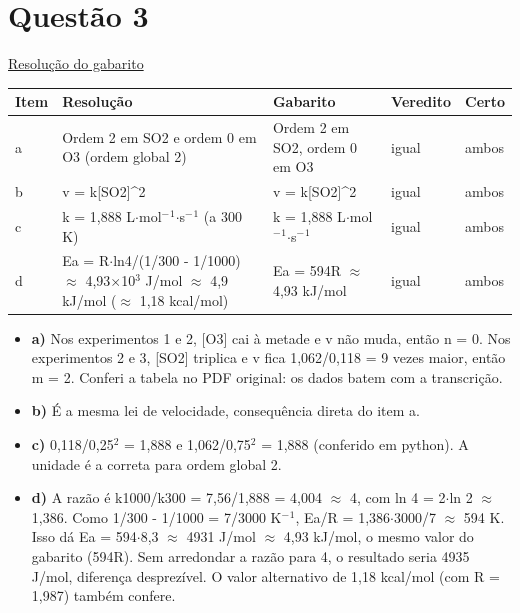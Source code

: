 \documentclass{article}%
\begin{document}
\section*{Questão 3}%
\href{https://poliedroresolve.sistemapoliedro.com.br/vestibulares/ime/2027/ime-2-fase-dia-3-28-10-2026-2-fase-dia-3/dissertativa-3-quimica-2-fase-dia-3-ime-2027}{Resolução do gabarito}\par\smallskip%
\begin{longtable}{@{}p{} p{} p{} p{} p{}@{}}\toprule Item & Resolução & Gabarito & Veredito & Certo \\ \midrule
a & Ordem 2 em SO2 e ordem 0 em O3 (ordem global 2) & Ordem 2 em SO2, ordem 0 em O3 & igual & ambos \\
b & v = k{[}SO2{]}\^{}2 & v = k{[}SO2{]}\^{}2 & igual & ambos \\
c & k = 1,888 L$\cdot$mol$^{-}$$^{1}$$\cdot$s$^{-}$$^{1}$ (a 300 K) & k = 1,888 L$\cdot$mol$^{-}$$^{1}$$\cdot$s$^{-}$$^{1}$ & igual & ambos \\
d & Ea = R$\cdot$ln4/(1/300 - 1/1000) $\approx$ 4,93$\times$10$^3$ J/mol $\approx$ 4,9 kJ/mol ($\approx$ 1,18 kcal/mol) & Ea = 594R $\approx$ 4,93 kJ/mol & igual & ambos \\
\bottomrule\end{longtable}%
\begin{itemize}%
\item%
\textbf{a)} Nos experimentos 1 e 2, {[}O3{]} cai à metade e v não muda, então n = 0. Nos experimentos 2 e 3, {[}SO2{]} triplica e v fica 1,062/0,118 = 9 vezes maior, então m = 2. Conferi a tabela no PDF original: os dados batem com a transcrição.%
\item%
\textbf{b)} É a mesma lei de velocidade, consequência direta do item a.%
\item%
\textbf{c)} 0,118/0,25$^2$ = 1,888 e 1,062/0,75$^2$ = 1,888 (conferido em python). A unidade é a correta para ordem global 2.%
\item%
\textbf{d)} A razão é k1000/k300 = 7,56/1,888 = 4,004 $\approx$ 4, com ln 4 = 2$\cdot$ln 2 $\approx$ 1,386. Como 1/300 - 1/1000 = 7/3000 K$^{-}$$^{1}$, Ea/R = 1,386$\cdot$3000/7 $\approx$ 594 K. Isso dá Ea = 594$\cdot$8,3 $\approx$ 4931 J/mol $\approx$ 4,93 kJ/mol, o mesmo valor do gabarito (594R). Sem arredondar a razão para 4, o resultado seria 4935 J/mol, diferença desprezível. O valor alternativo de 1,18 kcal/mol (com R = 1,987) também confere.%
\end{itemize}%
\end{document}
